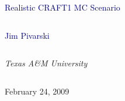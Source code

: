 \documentclass[compress]{beamer}
\begin{document}
\begin{frame}
\vfill
\begin{center}
\textcolor{darkblue}{\Large Realistic CRAFT1 MC Scenario}

\vfill
\begin{columns}
\begin{center}
\large
\textcolor{darkblue}{Jim Pivarski}
\end{center}
\end{columns}

\begin{columns}
\begin{center}
\scriptsize
{\it Texas A\&M University}
\end{center}
\end{columns}

\vfill
February 24, 2009
\end{center}
\end{frame}


\small
\end{document}
